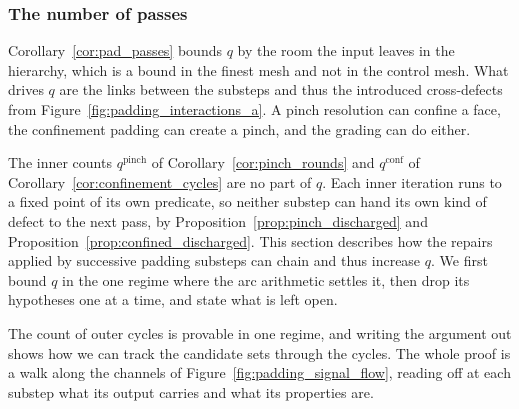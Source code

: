 \documentclass[a4paper, 12pt]{article}
\theoremstyle{definition}
\theoremstyle{plain}
\numberwithin{equation}{section}
\begin{document}
\subsubsection{The number of passes}
\label{subsubsec:pass_count}

Corollary~\ref{cor:pad_passes} bounds $q$ by the room the input leaves in the hierarchy, which is a bound in the finest mesh and not in the control mesh. What drives $q$ are the links between the substeps and thus the introduced cross-defects from Figure~\ref{fig:padding_interactions_a}. A pinch resolution can confine a face, the confinement padding can create a pinch, and the grading can do either.

The inner counts $q^{\mathrm{pinch}}$ of Corollary~\ref{cor:pinch_rounds} and $q^{\mathrm{conf}}$ of Corollary~\ref{cor:confinement_cycles} are no part of $q$. Each inner iteration runs to a fixed point of its own predicate, so neither substep can hand its own kind of defect to the next pass, by Proposition~\ref{prop:pinch_discharged} and Proposition~\ref{prop:confined_discharged}. This section describes how the repairs applied by successive padding substeps can chain and thus increase $q$. We first bound $q$ in the one regime where the arc arithmetic settles it, then drop its hypotheses one at a time, and state what is left open.

\smallskip

The count of outer cycles is provable in one regime, and writing the argument out shows how we can track the candidate sets through the cycles. The whole proof is a walk along the channels of Figure~\ref{fig:padding_signal_flow}, reading off at each substep what its output carries and what its properties are.
\end{document}
